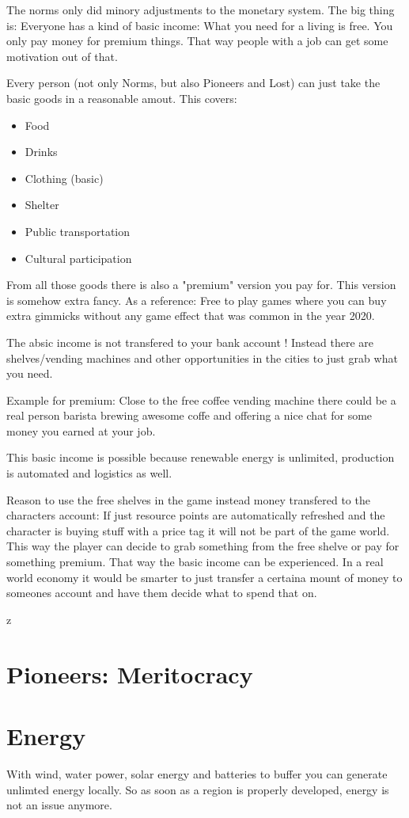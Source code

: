 The norms only did minory adjustments to the monetary system. The big thing is: Everyone has a kind of basic income: What you need for a living is free.
You only pay money for premium things. That way people with a job can get some motivation out of that.

Every person (not only Norms, but also Pioneers and Lost) can just take the basic goods in a reasonable amout. This covers:

\begin{itemize}
    \item Food
    \item Drinks
    \item Clothing (basic)
    \item Shelter
    \item Public transportation
    \item Cultural participation
\end{itemize}

From all those goods there is also a "premium" version you pay for. This version is somehow extra fancy. As a reference: Free to play games where you can buy extra gimmicks without any game effect that was common in the year 2020.

The absic income is not transfered to your bank account ! Instead there are shelves/vending machines and other opportunities in the cities to just grab what you need.

Example for premium: Close to the free coffee vending machine there could be a real person barista brewing awesome coffe and offering a nice chat for some money you earned at your job.

This basic income is possible because renewable energy is unlimited, production is automated and logistics as well.

\begin{reason}[]
    Reason to use the free shelves in the game instead money transfered to the characters account: If just resource points are automatically refreshed and the character is buying stuff with a price tag it will not be part of the game world. This way the player can decide to grab something from the free shelve or pay for something premium. That way the basic income can be experienced. In a real world economy it would be smarter to just transfer a certaina mount of money to someones account and have them decide what to spend that on.
\end{reason}
z
\section{Pioneers: Meritocracy}



\section{Energy}

With wind, water power, solar energy and batteries to buffer you can generate unlimted energy locally. So as soon as a region is properly developed, energy is not an issue anymore.
